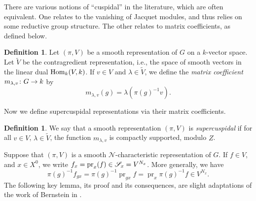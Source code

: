 \documentclass[letter]{amsart}
\theoremstyle{definition}
\newtheorem{definition}[thm]{Definition}
\theoremstyle{remark}
\numberwithin{thm}{section}
\numberwithin{equation}{section}
\renewcommand{\NN}{{\mathcal N}}
\DeclareMathOperator{\pr}{pr}
\begin{document}
There are various notions of ``cuspidal'' in the literature, which are often equivalent.  One relates to the vanishing of Jacquet modules, and thus relies on some reductive group structure.  The other relates to matrix coefficients, as defined below.
\begin{definition}
Let $(\pi, V)$ be a smooth representation of $G$ on a $k$-vector space.  Let $\tilde V$ be the contragredient representation, i.e., the space of smooth vectors in the linear dual $\operatorname{Hom}_k(V, k)$.  If $v \in V$ and $\lambda \in \tilde V$, we define the {\em matrix coefficient} $m_{\lambda, v} \colon G \rightarrow k$ by
$$m_{\lambda, v}(g) = \lambda \left( \pi(g)^{-1} v \right).$$
\end{definition}

Now we define supercuspidal representations via their matrix coefficients.
\begin{definition}
We say that a smooth representation $(\pi, V)$ is {\em supercuspidal} if for all $v \in V$, $\lambda \in \tilde V$, the function $m_{\lambda, v}$ is compactly supported, modulo $Z$.
\end{definition}

Suppose that $(\pi, V)$ is a smooth $\NN$-characteristic representation of $G$.  If $f \in V$, and $x \in X^0$, we write $f_x = \pr_x(f) \in \sheaf{S}_x = V^{N_x}$.  More generally, we have
$$\pi(g)^{-1} f_{gx} = \pi(g)^{-1} \pr_{gx} f = \pr_x \pi(g)^{-1} f \in V^{N_x}.$$
The following key lemma, its proof and its consequences, are slight adaptations of the work of Bernstein in \cite[Theorem 6]{Bernstein}.
\end{document}
